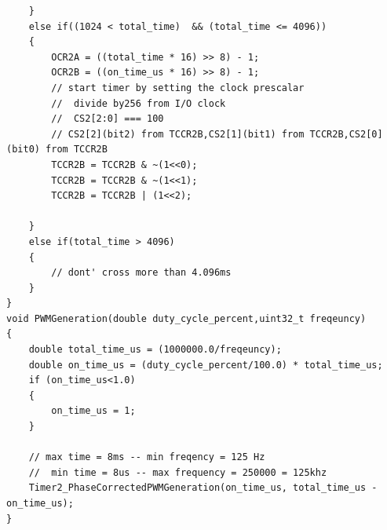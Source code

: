 \documentclass{article}
\begin{document}
\begin{verbatim}
	}
	else if((1024 < total_time)  && (total_time <= 4096))
	{
		OCR2A = ((total_time * 16) >> 8) - 1;
		OCR2B = ((on_time_us * 16) >> 8) - 1;
		// start timer by setting the clock prescalar
		//  divide by256 from I/O clock
		//  CS2[2:0] === 100
		// CS2[2](bit2) from TCCR2B,CS2[1](bit1) from TCCR2B,CS2[0](bit0) from TCCR2B
		TCCR2B = TCCR2B & ~(1<<0);
		TCCR2B = TCCR2B & ~(1<<1);
		TCCR2B = TCCR2B | (1<<2);
		
	}
	else if(total_time > 4096)
	{
		// dont' cross more than 4.096ms
	}
}
void PWMGeneration(double duty_cycle_percent,uint32_t freqeuncy)
{
	double total_time_us = (1000000.0/freqeuncy);	
	double on_time_us = (duty_cycle_percent/100.0) * total_time_us;
	if (on_time_us<1.0)
	{
		on_time_us = 1;
	}
	
	// max time = 8ms -- min freqency = 125 Hz
	//  min time = 8us -- max frequency = 250000 = 125khz
	Timer2_PhaseCorrectedPWMGeneration(on_time_us, total_time_us - on_time_us);
}
\end{verbatim}
\end{document}
